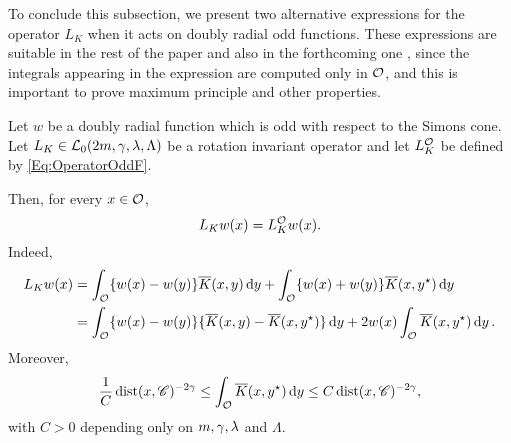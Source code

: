 To conclude this subsection, we present two alternative expressions for the operator $L_K$ when it acts on doubly radial odd functions. These expressions are suitable in the rest of the paper and also in the forthcoming one \cite{FelipeSanz-Perela:IntegroDifferentialII}, since the integrals appearing in the expression are computed only in $\mathcal{O}$, and this is important to prove maximum principle and other properties.

\begin{lemma}
	\label{Lemma:OperatorOddF}
	Let $w$ be a doubly radial function which is odd with respect to the Simons cone. Let $L_K \in \mathcal{L}_0(2m,\gamma,\lambda, \Lambda)$ be a rotation invariant operator and let $L_K^{\mathcal{O}}$ be defined by \eqref{Eq:OperatorOddF}. 
	
	Then, for every $x\in\mathcal{O}$,
	$$ 	L_K w (x) = L_K^{\mathcal{O}} w(x).   $$
	Indeed,
	\begin{align*}
	L_K w (x) &= \int_{\mathcal{O}} \{w(x) - w(y) \} \overline{K}(x, y) \,\mathrm{d} y +  \int_{\mathcal{O}} \{w(x) + w(y) \} \overline{K}(x, y^\star) \,\mathrm{d} y \\
	&= \int_{\mathcal{O}} \{w(x) - w(y) \} \{\overline{K}(x, y) - \overline{K}(x, y^\star)  \} \,\mathrm{d} y +  2 w(x) \int_{\mathcal{O}} \overline{K}(x, y^\star) \,\mathrm{d} y \,.
	\end{align*}
	Moreover,
	\begin{equation}
	\label{Eq:ZeroOrderTerm}
		\dfrac{1}{C} \operatorname{dist}(x,\mathscr{C})^{-2\gamma} \leq \int_{\mathcal{O}} \overline{K}(x, y^\star) \,\mathrm{d} y \leq C \operatorname{dist}(x,\mathscr{C})^{-2\gamma},
	\end{equation}
	with $C>0$ depending only on $m, \gamma, \lambda$ and $\Lambda$.
\end{lemma}

